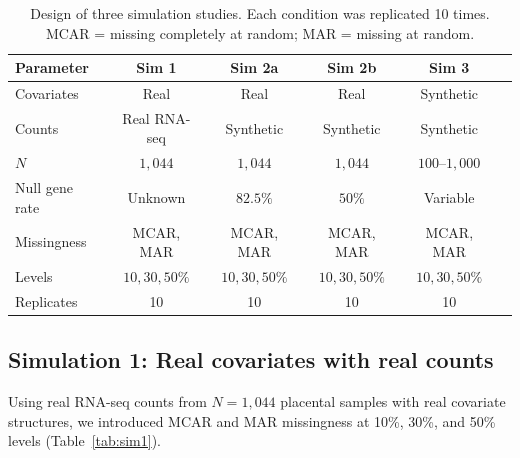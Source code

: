 \documentclass[11pt]{article}
\begin{document}
\begin{table}[H]
\centering
\caption{Design of three simulation studies. Each condition was replicated 10 times. MCAR = missing completely at random; MAR = missing at random.}
\label{tab:sim_design}
\begin{tabular}{lccccc}
\toprule
\textbf{Parameter} & \textbf{Sim 1} & \textbf{Sim 2a} & \textbf{Sim 2b} & \textbf{Sim 3} \\
\midrule
Covariates & Real & Real & Real & Synthetic \\
Counts & Real RNA-seq & Synthetic & Synthetic & Synthetic \\
$N$ & $1{,}044$ & $1{,}044$ & $1{,}044$ & $100$--$1{,}000$ \\
Null gene rate & Unknown & $82.5\%$ & $50\%$ & Variable \\
Missingness & MCAR, MAR & MCAR, MAR & MCAR, MAR & MCAR, MAR \\
Levels & $10, 30, 50\%$ & $10, 30, 50\%$ & $10, 30, 50\%$ & $10, 30, 50\%$ \\
Replicates & 10 & 10 & 10 & 10 \\
\bottomrule
\end{tabular}
\end{table}

\subsection{Simulation 1: Real covariates with real counts}

Using real RNA-seq counts from $N = 1{,}044$ placental samples with real covariate structures, we introduced MCAR and MAR missingness at 10\%, 30\%, and 50\% levels (Table~\ref{tab:sim1}).
\end{document}
